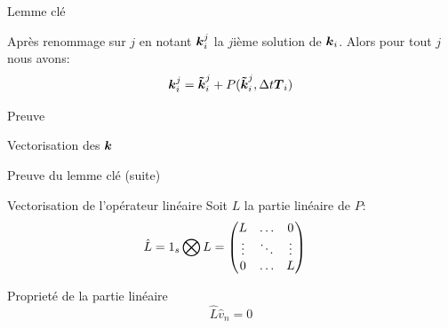 \begin{frame}{Lemme clé}
\begin{lemma}
 Après renommage sur $j$ en notant ${\boldsymbol {k}}_{i}^{j}$ la $j$ième solution de ${\boldsymbol {k}}_{i}$.
Alors pour tout $j$ nous avons:
\begin{equation*}
  {\boldsymbol {k}}_{i}^{j}={\boldsymbol {\tilde{k}}}_{i}^{j}+P({\boldsymbol {\tilde{k}}}_{i}^{j},\Delta t {\boldsymbol {T}}_{i})
\end{equation*}
\end{lemma}
\begin{block}{Preuve}
\end{block}

\begin{block}{Vectorisation des ${\boldsymbol {k}}$}
 \end{block}

\end{frame}

\begin{frame}[<+->]{Preuve du lemme clé (suite)}
 \begin{block}{Vectorisation de l'opérateur linéaire}
 Soit $L$ la partie linéaire de $P$:
\begin{align*}
\hat{L}&=1_{s}\bigotimes L=\begin{pmatrix}L	&\ldots	&0\\
			\vdots &\ddots 	&\vdots\\
			0	&\ldots	&L\\
	\end{pmatrix}
\end{align*}
\end{block}
\begin{block}{Proprieté de la partie linéaire}
\begin{equation*}
\hat{L}\hat{v}_{n}=0
\end{equation*}
 \end{block}

\end{frame}


